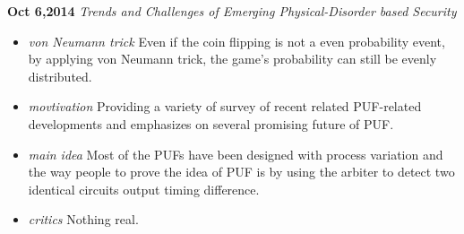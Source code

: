 \documentclass[]{article}
\begin{document}
\noindent \textbf{Oct 6,2014}
\textit{Trends and Challenges of Emerging Physical-Disorder based Security}
\indent		\begin{itemize}
            \item \textit{von Neumann trick} Even if the coin flipping is not a even probability 
            event, by applying von Neumann trick, the game's probability can still be evenly 
            distributed.

            \item \textit{movtivation} Providing a variety of survey of recent related PUF-related
            developments and emphasizes on several promising future of PUF.

            \item \textit{main idea} Most of the PUFs have been designed with process variation and
            the way people to prove the idea of PUF is by using the arbiter to detect two identical
            circuits output timing difference.

            \item \textit{critics} Nothing real.

            \end{itemize}
\end{document}
